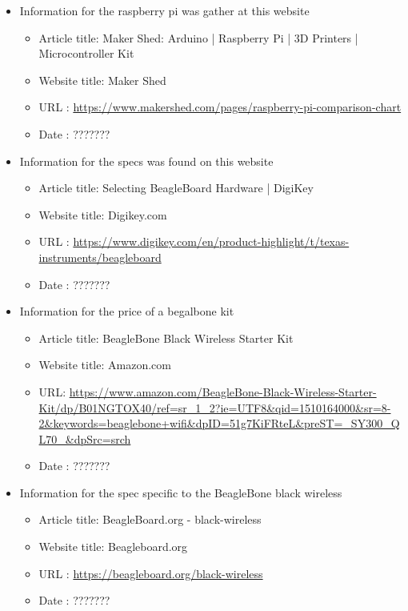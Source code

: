 \documentclass{article}
\begin{document}
\begin{thebibliography}{56}

    \begin{itemize}
        \item Information for the raspberry pi was gather at this website
        \begin{itemize}
            \item Article title: Maker Shed: Arduino | Raspberry Pi | 3D Printers | Microcontroller Kit
            \item Website title: Maker Shed
            \item URL          : \url{https://www.makershed.com/pages/raspberry-pi-comparison-chart}
            \item Date         : ???????
        \end{itemize}
    \end{itemize}

    \begin{itemize}
        \item Information for the specs was found on this website
        \begin{itemize}
            \item Article title: Selecting BeagleBoard Hardware | DigiKey
            \item Website title: Digikey.com
            \item URL          : \url{https://www.digikey.com/en/product-highlight/t/texas-instruments/beagleboard}
            \item Date         : ???????
        \end{itemize}

        \item Information for the price of a begalbone kit
        \begin{itemize}
            \item Article title: BeagleBone Black Wireless Starter Kit
            \item Website title: Amazon.com
            \item URL: \url{https://www.amazon.com/BeagleBone-Black-Wireless-Starter-Kit/dp/B01NGTOX40/ref=sr_1_2?ie=UTF8&qid=1510164000&sr=8-2&keywords=beaglebone+wifi&dpID=51g7KiFRteL&preST=_SY300_QL70_&dpSrc=srch}
            \item Date         : ???????
        \end{itemize}

        \item Information for the spec specific to the BeagleBone black wireless
        \begin{itemize}
            \item Article title: BeagleBoard.org - black-wireless
            \item Website title: Beagleboard.org
            \item URL          : \url{https://beagleboard.org/black-wireless}
            \item Date         : ???????
        \end{itemize}


\end{itemize}
\end{thebibliography}
\end{document}
